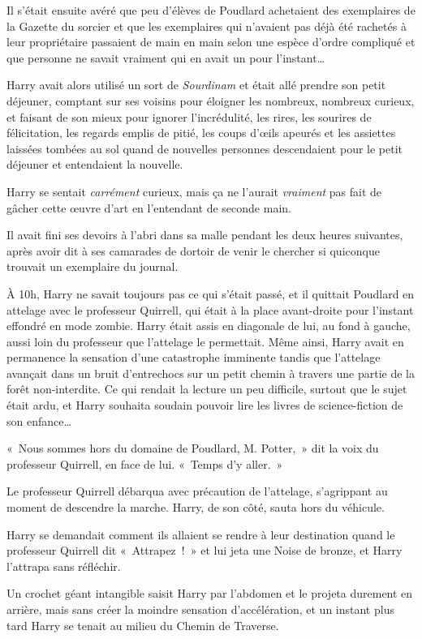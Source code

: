 Il s'était ensuite avéré que peu d'élèves de Poudlard achetaient des exemplaires de la Gazette du sorcier et que les exemplaires qui n'avaient pas déjà été rachetés à leur propriétaire passaient de main en main selon une espèce d'ordre compliqué et que personne ne savait vraiment qui en avait un pour l'instant…

Harry avait alors utilisé un sort de \emph{Sourdinam} et était allé prendre son petit déjeuner, comptant sur ses voisins pour éloigner les nombreux, nombreux curieux, et faisant de son mieux pour ignorer l'incrédulité, les rires, les sourires de félicitation, les regards emplis de pitié, les coups d'œils apeurés et les assiettes laissées tombées au sol quand de nouvelles personnes descendaient pour le petit déjeuner et entendaient la nouvelle.

Harry se sentait \emph{carrément} curieux, mais ça ne l'aurait \emph{vraiment} pas fait de gâcher cette œuvre d'art en l'entendant de seconde main.

Il avait fini ses devoirs à l'abri dans sa malle pendant les deux heures suivantes, après avoir dit à ses camarades de dortoir de venir le chercher si quiconque trouvait un exemplaire du journal.

À 10h, Harry ne savait toujours pas ce qui s'était passé, et il quittait Poudlard en attelage avec le professeur Quirrell, qui était à la place avant-droite pour l'instant effondré en mode zombie.
Harry était assis en diagonale de lui, au fond à gauche, aussi loin du professeur que l'attelage le permettait.
Même ainsi, Harry avait en permanence la sensation d'une catastrophe imminente tandis que l'attelage avançait dans un bruit d'entrechocs sur un petit chemin à travers une partie de la forêt non-interdite.
Ce qui rendait la lecture un peu difficile, surtout que le sujet était ardu, et Harry souhaita soudain pouvoir lire les livres de science-fiction de son enfance…

«~Nous sommes hors du domaine de Poudlard, M. Potter,~» dit la voix du professeur Quirrell, en face de lui.
«~Temps d'y aller.~»

Le professeur Quirrell débarqua avec précaution de l'attelage, s'agrippant au moment de descendre la marche.
Harry, de son côté, sauta hors du véhicule.

Harry se demandait comment ils allaient se rendre à leur destination quand le professeur Quirrell dit «~Attrapez~!~»
et lui jeta une Noise de bronze, et Harry l'attrapa sans réfléchir.

Un crochet géant intangible saisit Harry par l'abdomen et le projeta durement en arrière, mais sans créer la moindre sensation d'accélération, et un instant plus tard Harry se tenait au milieu du Chemin de Traverse.

